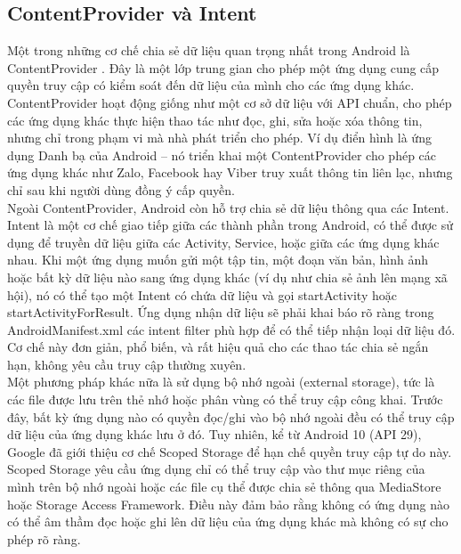 \subsection{ContentProvider và Intent}    
        \hspace*{0.8cm}Một trong những cơ chế chia sẻ dữ liệu quan trọng nhất trong Android là ContentProvider \cite{Content-Providers}. Đây là một lớp trung gian cho phép một ứng dụng cung cấp quyền truy cập có kiểm soát đến dữ liệu của mình cho các ứng dụng khác. ContentProvider hoạt động giống như một cơ sở dữ liệu với API chuẩn, cho phép các ứng dụng khác thực hiện thao tác như đọc, ghi, sửa hoặc xóa thông tin, nhưng chỉ trong phạm vi mà nhà phát triển cho phép. Ví dụ điển hình là ứng dụng Danh bạ của Android – nó triển khai một ContentProvider cho phép các ứng dụng khác như Zalo, Facebook hay Viber truy xuất thông tin liên lạc, nhưng chỉ sau khi người dùng đồng ý cấp quyền.\\
        \hspace*{0.8cm}Ngoài ContentProvider, Android còn hỗ trợ chia sẻ dữ liệu thông qua các Intent. Intent là một cơ chế giao tiếp giữa các thành phần trong Android, có thể được sử dụng để truyền dữ liệu giữa các Activity, Service, hoặc giữa các ứng dụng khác nhau. Khi một ứng dụng muốn gửi một tập tin, một đoạn văn bản, hình ảnh hoặc bất kỳ dữ liệu nào sang ứng dụng khác (ví dụ như chia sẻ ảnh lên mạng xã hội), nó có thể tạo một Intent có chứa dữ liệu và gọi startActivity hoặc startActivityForResult. Ứng dụng nhận dữ liệu sẽ phải khai báo rõ ràng trong AndroidManifest.xml các intent filter phù hợp để có thể tiếp nhận loại dữ liệu đó. Cơ chế này đơn giản, phổ biến, và rất hiệu quả cho các thao tác chia sẻ ngắn hạn, không yêu cầu truy cập thường xuyên.\\
        \hspace*{0.8cm}Một phương pháp khác nữa là sử dụng bộ nhớ ngoài (external storage), tức là các file được lưu trên thẻ nhớ hoặc phân vùng có thể truy cập công khai. Trước đây, bất kỳ ứng dụng nào có quyền đọc/ghi vào bộ nhớ ngoài đều có thể truy cập dữ liệu của ứng dụng khác lưu ở đó. Tuy nhiên, kể từ Android 10 (API 29), Google đã giới thiệu cơ chế Scoped Storage để hạn chế quyền truy cập tự do này. Scoped Storage yêu cầu ứng dụng chỉ có thể truy cập vào thư mục riêng của mình trên bộ nhớ ngoài hoặc các file cụ thể được chia sẻ thông qua MediaStore hoặc Storage Access Framework. Điều này đảm bảo rằng không có ứng dụng nào có thể âm thầm đọc hoặc ghi lên dữ liệu của ứng dụng khác mà không có sự cho phép rõ ràng.

